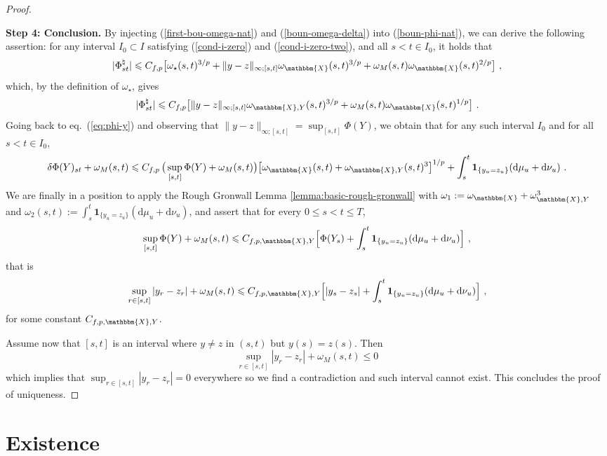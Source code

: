\documentclass[11pt,reqno,oneside]{amsart}
\numberwithin{equation}{section}
\newcommand{\assign}{:=}
\newcommand{\mathd}{\mathrm{d}}
\newcommand{\tmtextbf}[1]{{\bfseries{#1}}}
\newcommand{\om}{\omega}
\begin{document}
\begin{proof}
 	\
  
  {\noindent}\tmtextbf{Step 4: Conclusion.}  By injecting (\ref{first-bou-omega-nat}) and (\ref{boun-omega-delta}) into (\ref{boun-phi-nat}), we can derive the following assertion: for any interval $I_0\subset I$ satisfying (\ref{cond-i-zero}) and (\ref{cond-i-zero-two}), and all $s<t\in I_0$, it holds that
  \[ | \Phi^{\natural}_{s t} | \leqslant C_{f,p} \big[ \omega_\star(s,t)^{3/p}+\|y-z\|_{\infty;[s,t]} \omega_{\mathbbm{X}}(s,t)^{3/p}+\omega_M(s,t)\omega_{\mathbbm{X}}(s,t)^{2/p}\big]  \ , \]
	which, by the definition of $\omega_\star$, gives 
\[ | \Phi^{\natural}_{s t} | \leqslant C_{f,p} \big[ \|y-z\|_{\infty;[s,t]} \omega_{\mathbbm{X},Y}(s,t)^{3/p}+\omega_M(s,t)\omega_{\mathbbm{X}}(s,t)^{1/p}\big]  \ . \]
Going back to eq.~(\ref{eq:phi-y}) and observing that $\|y-z\|_{\infty;[s,t]} =\sup_{[s,t]} \Phi(Y)$, we obtain that for any such interval $I_0$ and for all $s<t\in I_0$,
  \begin{equation*}
	\delta \Phi(Y)_{st} + \omega_M (s, t)\leqslant C_{f,p}\, \big(\sup_{[s, t]} \Phi (Y)+\omega_M(s,t)\big)\big[\omega_{\mathbbm{X}} (s, t)+\omega_{\mathbbm{X},Y}(s,t)^3\big]^{1/p}+  \int_s^t
     \mathbf{1}_{\{y_u=z_u\}} (\mathd \mu_u + \mathd \nu_u) \ .
		\end{equation*}
We are finally in a position to apply the Rough Gronwall Lemma \ref{lemma:basic-rough-gronwall} with $\om_{1}\assign \om_{\mathbbm{X}}+\om_{\mathbbm{X},Y}^{3}$ and $\om_{2}(s,t)\assign \int_s^t \mathbf{1}_{\{y_u=z_u\}} (\mathd \mu_u + \mathd \nu_u)$, and assert that for every $0\leqslant s<t\leqslant T$, 
  \[ \sup_{[s, t]} \Phi (Y) + \omega_M (s, t) \leqslant C_{f,p,\mathbbm{X},Y}\Big[  \Phi(Y_s)  +
     \int_s^t \mathbf{1}_{\{y_u = z_u\}} (\mathd \mu_u + \mathd \nu_u)\Big] \ , \]
		that is
		  \[ \sup_{r\in [s, t]} |y_r-z_r| + \omega_M (s, t) \leqslant C_{f,p,\mathbbm{X},Y}\Big[ | y_s-z_s| +
     \int_s^t \mathbf{1}_{\{y_u = z_u\}} (\mathd \mu_u + \mathd \nu_u)\Big] \ , \]
		for some constant $C_{f,p,\mathbbm{X},Y}$. 
		
		\smallskip
		
\noindent
Assume now that $[s, t]$ is an interval where $y \neq z$ in $(s, t)$ but $y (s)
  = z (s)$. Then
  \[ \sup_{r\in [s, t]} |y_r-z_r| + \omega_M (s, t) \leqslant 0 \]
  which implies that $\sup_{r\in [s, t]} |y_r-z_r| = 0$ everywhere so we find a
  contradiction and such interval cannot exist. This concludes the proof of
  uniqueness.
\end{proof}


\section{Existence}\label{sec:existence}
\end{document}
